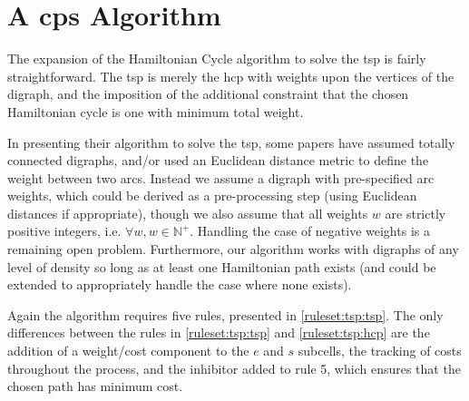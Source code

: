 \section{\label{sec:tsp:algotsp}A \texorpdfstring{\gls{cps}}{cP systems} \texorpdfstring{}{Travelling Salesman Problem} Algorithm}

The expansion of the Hamiltonian Cycle algorithm to solve the \gls{tsp} is fairly straightforward.  The \gls{tsp} is merely the \gls{hcp} with weights upon the vertices of the digraph, and the imposition of the additional constraint that the chosen Hamiltonian cycle is one with minimum total weight.  

In presenting their algorithm to solve the \gls{tsp}, some papers have assumed totally connected digraphs, and/or used an Euclidean distance metric to define the weight between two arcs.  Instead we assume a digraph with pre-specified arc weights, which could be derived as a pre-processing step (using Euclidean distances if appropriate), though we also assume that all weights \(w\) are strictly positive integers, i.e. \(\forall w, w \in \mathbb{N^+}\).  Handling the case of negative weights is a remaining open problem.  Furthermore, our algorithm works with digraphs of any level of density so long as at least one Hamiltonian path exists (and could be extended to appropriately handle the case where none exists).


Again the algorithm requires five rules, presented in \autoref{ruleset:tsp:tsp}.  The only differences between the rules in \autoref{ruleset:tsp:tsp} and \autoref{ruleset:tsp:hcp} are the addition of a weight/cost component to the \(e\) and \(s\) subcells, the tracking of costs throughout the process, and the inhibitor added to rule 5, which ensures that the chosen path has minimum cost.

\cpresetrulenumber

